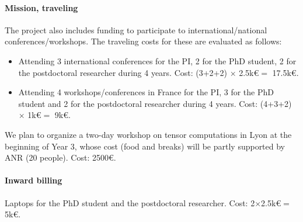 \documentclass[a4paper,11pt]{article}
\begin{document}
\paragraph{Mission, traveling} The project also includes funding to participate to international/national conferences/workshops. The traveling costs for these are evaluated as follows:
\begin{itemize}
	\item Attending 3 international conferences for the PI, 2 for the PhD student, 2 for the postdoctoral researcher during 4 years. Cost: (3+2+2) $\times $ 2.5k\euro $=$ 17.5k\euro.
	\item Attending 4 workshops/conferences in France for the PI, 3 for the PhD student and 2 for the postdoctoral researcher during 4 years. Cost: (4+3+2) $\times$ 1k\euro $=$ 9k\euro.
\end{itemize}
We plan to organize a two-day workshop on tensor computations in Lyon at the beginning of Year 3, whose cost (food and breaks) will be partly supported by ANR (20 people). Cost: 2500\euro.

\paragraph{Inward billing} Laptops for the PhD student and the postdoctoral researcher. Cost: 2$\times$2.5k\euro $=$ 5k\euro.







	
	
	
	
	\newcommand{\oc}{\cellcolor{orange1}}
	\newcommand{\br}{\cellcolor{orange1}{\ding{45}}}%
	\newcommand{\bs}{\cellcolor{orange1}{\ding{171}}}%
	\newcommand{\bsr}{\cellcolor{orange1}{\ding{45}\ding{171}}}%
	\newcommand{\gc}{\cellcolor{green}{\ding{171}}}%
	\newcommand{\re}{\cellcolor{gray}{}}%
	\newcommand{\orepo}{\cellcolor{orange1}{\ding{95}}}%
	
	
	
\end{document}
